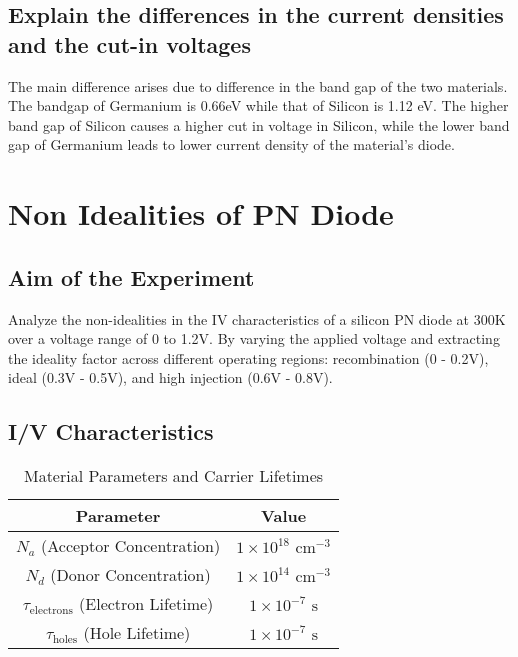 \documentclass[a4paper]{article}
\begin{document}
\subsection{Explain the differences in the current densities and the cut-in voltages}
The main difference arises due to difference in the band gap of the two materials. The bandgap of Germanium is 0.66eV while that of Silicon is 1.12 eV. The higher band gap of Silicon causes a higher cut in voltage in Silicon, while the lower band gap of Germanium leads to lower current density of the material's diode.
\newpage
























\newpage

\section{Non Idealities of PN Diode}

\subsection{Aim of the Experiment}
Analyze the non-idealities in the IV characteristics of a silicon PN diode at 300K over a voltage range of 0 to 1.2V. By varying the applied voltage and extracting the ideality factor across different operating regions: recombination (0 - 0.2V), ideal (0.3V - 0.5V), and high injection (0.6V - 0.8V).

\subsection{I/V Characteristics}
\begin{table}[h!]
\centering
\begin{tabular}{|c|c|}
\hline
\textbf{Parameter} & \textbf{Value} \\ \hline
$N_a$ (Acceptor Concentration) & $1 \times 10^{18} \text{ cm}^{-3}$ \\ \hline
$N_d$ (Donor Concentration)     & $1 \times 10^{14} \text{ cm}^{-3}$ \\ \hline
$\tau_{\text{electrons}}$ (Electron Lifetime) & $1 \times 10^{-7} \text{ s}$ \\ \hline
$\tau_{\text{holes}}$ (Hole Lifetime)         & $1 \times 10^{-7} \text{ s}$ \\ \hline
\end{tabular}
\caption{Material Parameters and Carrier Lifetimes}
\label{tab:material_parameters}
\end{table}
\end{document}
